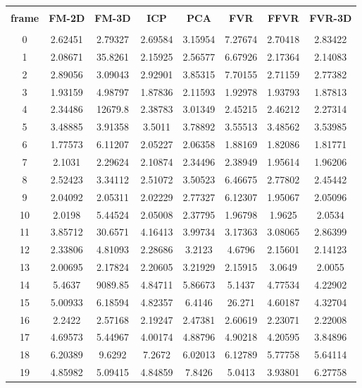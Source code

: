 \begin{center}
\begin{longtable}{cccccccc}
\hline \\
\textbf{frame} & \textbf{FM-2D} & \textbf{FM-3D} & \textbf{ICP} & \textbf{PCA} & \textbf{FVR} & \textbf{FFVR} & \textbf{FVR-3D} \\
\hline \\
0 & 2.62451 & 2.79327 & 2.69584 & 3.15954 & 7.27674 & 2.70418 & 2.83422\\
1 & 2.08671 & 35.8261 & 2.15925 & 2.56577 & 6.67926 & 2.17364 & 2.14083\\
2 & 2.89056 & 3.09043 & 2.92901 & 3.85315 & 7.70155 & 2.71159 & 2.77382\\
3 & 1.93159 & 4.98797 & 1.87836 & 2.11593 & 1.92978 & 1.93793 & 1.87813\\
4 & 2.34486 & 12679.8 & 2.38783 & 3.01349 & 2.45215 & 2.46212 & 2.27314\\
5 & 3.48885 & 3.91358 & 3.5011 & 3.78892 & 3.55513 & 3.48562 & 3.53985\\
6 & 1.77573 & 6.11207 & 2.05227 & 2.06358 & 1.88169 & 1.82086 & 1.81771\\
7 & 2.1031 & 2.29624 & 2.10874 & 2.34496 & 2.38949 & 1.95614 & 1.96206\\
8 & 2.52423 & 3.34112 & 2.51072 & 3.50523 & 6.46675 & 2.77802 & 2.45442\\
9 & 2.04092 & 2.05311 & 2.02229 & 2.77327 & 6.12307 & 1.95067 & 2.05096\\
10 & 2.0198 & 5.44524 & 2.05008 & 2.37795 & 1.96798 & 1.9625 & 2.0534\\
11 & 3.85712 & 30.6571 & 4.16413 & 3.99734 & 3.17363 & 3.08065 & 2.86399\\
12 & 2.33806 & 4.81093 & 2.28686 & 3.2123 & 4.6796 & 2.15601 & 2.14123\\
13 & 2.00695 & 2.17824 & 2.20605 & 3.21929 & 2.15915 & 3.0649 & 2.0055\\
14 & 5.4637 & 9089.85 & 4.84711 & 5.86673 & 5.1437 & 4.77534 & 4.22902\\
15 & 5.00933 & 6.18594 & 4.82357 & 6.4146 & 26.271 & 4.60187 & 4.32704\\
16 & 2.2422 & 2.57168 & 2.19247 & 2.47381 & 2.60619 & 2.23071 & 2.22008\\
17 & 4.69573 & 5.44967 & 4.00174 & 4.88796 & 4.90218 & 4.20595 & 3.84896\\
18 & 6.20389 & 9.6292 & 7.2672 & 6.02013 & 6.12789 & 5.77758 & 5.64114\\
19 & 4.85982 & 5.09415 & 4.84859 & 7.8426 & 5.0413 & 3.93801 & 6.27758\\

\end{longtable}
\end{center}
